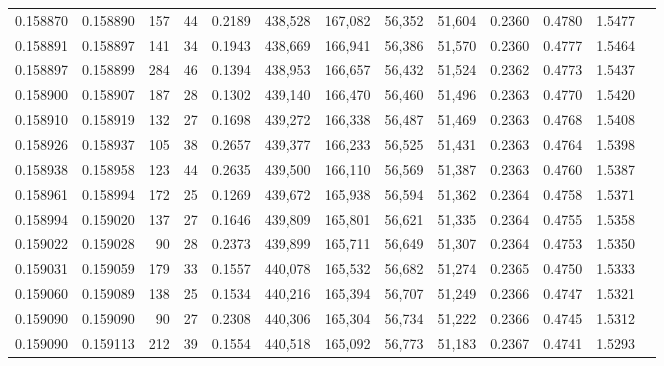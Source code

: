 \begin{tabular}{rrrrrrrrrrrrr}
0.158870 & 0.158890 &   157 &  44 &                                     0.2189 & 438,528 & 167,082 &  56,352 &  51,604 & 0.2360 & 0.4780 & 1.5477 \\
0.158891 & 0.158897 &   141 &  34 &                                     0.1943 & 438,669 & 166,941 &  56,386 &  51,570 & 0.2360 & 0.4777 & 1.5464 \\
0.158897 & 0.158899 &   284 &  46 &                                     0.1394 & 438,953 & 166,657 &  56,432 &  51,524 & 0.2362 & 0.4773 & 1.5437 \\
0.158900 & 0.158907 &   187 &  28 &                                     0.1302 & 439,140 & 166,470 &  56,460 &  51,496 & 0.2363 & 0.4770 & 1.5420 \\
0.158910 & 0.158919 &   132 &  27 &                                     0.1698 & 439,272 & 166,338 &  56,487 &  51,469 & 0.2363 & 0.4768 & 1.5408 \\
0.158926 & 0.158937 &   105 &  38 &                                     0.2657 & 439,377 & 166,233 &  56,525 &  51,431 & 0.2363 & 0.4764 & 1.5398 \\
0.158938 & 0.158958 &   123 &  44 &                                     0.2635 & 439,500 & 166,110 &  56,569 &  51,387 & 0.2363 & 0.4760 & 1.5387 \\
0.158961 & 0.158994 &   172 &  25 &                                     0.1269 & 439,672 & 165,938 &  56,594 &  51,362 & 0.2364 & 0.4758 & 1.5371 \\
0.158994 & 0.159020 &   137 &  27 &                                     0.1646 & 439,809 & 165,801 &  56,621 &  51,335 & 0.2364 & 0.4755 & 1.5358 \\
0.159022 & 0.159028 &    90 &  28 &                                     0.2373 & 439,899 & 165,711 &  56,649 &  51,307 & 0.2364 & 0.4753 & 1.5350 \\
0.159031 & 0.159059 &   179 &  33 &                                     0.1557 & 440,078 & 165,532 &  56,682 &  51,274 & 0.2365 & 0.4750 & 1.5333 \\
0.159060 & 0.159089 &   138 &  25 &                                     0.1534 & 440,216 & 165,394 &  56,707 &  51,249 & 0.2366 & 0.4747 & 1.5321 \\
0.159090 & 0.159090 &    90 &  27 &                                     0.2308 & 440,306 & 165,304 &  56,734 &  51,222 & 0.2366 & 0.4745 & 1.5312 \\
0.159090 & 0.159113 &   212 &  39 &                                     0.1554 & 440,518 & 165,092 &  56,773 &  51,183 & 0.2367 & 0.4741 & 1.5293 \\

\end{tabular}
